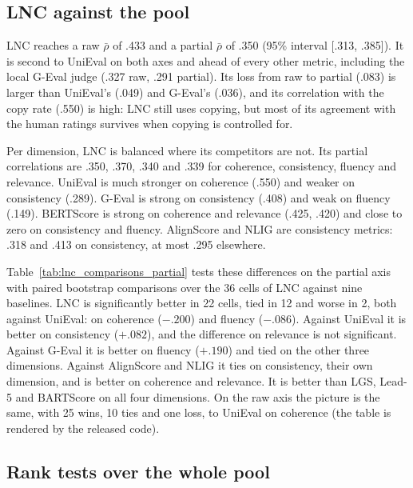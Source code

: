 \subsection{LNC against the pool}

LNC reaches a raw $\bar\rho$ of .433 and a partial $\bar\rho$ of .350 (95\% interval [.313, .385]). It is second to UniEval on both axes and ahead of every other metric, including the local G-Eval judge (.327 raw, .291 partial). Its loss from raw to partial (.083) is larger than UniEval's (.049) and G-Eval's (.036), and its correlation with the copy rate (.550) is high: LNC still uses copying, but most of its agreement with the human ratings survives when copying is controlled for.

Per dimension, LNC is balanced where its competitors are not. Its partial correlations are .350, .370, .340 and .339 for coherence, consistency, fluency and relevance. UniEval is much stronger on coherence (.550) and weaker on consistency (.289). G-Eval is strong on consistency (.408) and weak on fluency (.149). BERTScore is strong on coherence and relevance (.425, .420) and close to zero on consistency and fluency. AlignScore and NLIG are consistency metrics: .318 and .413 on consistency, at most .295 elsewhere.

Table~\ref{tab:lnc_comparisons_partial} tests these differences on the partial axis with paired bootstrap comparisons over the 36 cells of LNC against nine baselines. LNC is significantly better in 22 cells, tied in 12 and worse in 2, both against UniEval: on coherence ($-.200$) and fluency ($-.086$). Against UniEval it is better on consistency ($+.082$), and the difference on relevance is not significant. Against G-Eval it is better on fluency ($+.190$) and tied on the other three dimensions. Against AlignScore and NLIG it ties on consistency, their own dimension, and is better on coherence and relevance. It is better than LGS, Lead-5 and BARTScore on all four dimensions. On the raw axis the picture is the same, with 25 wins, 10 ties and one loss, to UniEval on coherence (the table is rendered by the released code).

\subsection{Rank tests over the whole pool}

